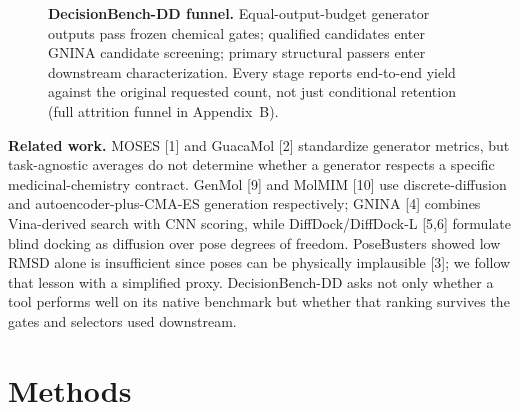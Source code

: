 \documentclass{article}
\begin{document}
\begin{figure}[t]
\centering
{}
\caption{\textbf{DecisionBench-DD funnel.} Equal-output-budget generator outputs pass frozen chemical gates; qualified candidates enter GNINA candidate screening; primary structural passers enter downstream characterization. Every stage reports end-to-end yield against the original requested count, not just conditional retention (full attrition funnel in Appendix~B).}
\label{fig:funnel}
\end{figure}

\textbf{Related work.} MOSES [1] and GuacaMol [2] standardize generator metrics, but task-agnostic averages do not determine whether a generator respects a specific medicinal-chemistry contract. GenMol [9] and MolMIM [10] use discrete-diffusion and autoencoder-plus-CMA-ES generation respectively; GNINA [4] combines Vina-derived search with CNN scoring, while DiffDock/DiffDock-L [5,6] formulate blind docking as diffusion over pose degrees of freedom. PoseBusters showed low RMSD alone is insufficient since poses can be physically implausible [3]; we follow that lesson with a simplified proxy. DecisionBench-DD asks not only whether a tool performs well on its native benchmark but whether that ranking survives the gates and selectors used downstream.

\section{Methods}
\end{document}
